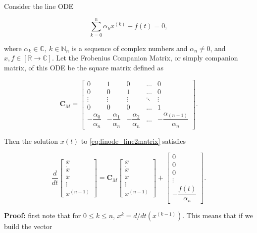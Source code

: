 \begin{theorem} \label{theorem:line_to_matrixode_equiv} %

	Consider the line ODE

\begin{equation} \sum\limits_{k=0}^n \alpha_k x^{\left(k\right)} + f(t) = 0, \label{eq:linode_line2matrix}\end{equation}

	\noindent where $\alpha_k\in\mathbb{C},\ k\in\mathbb{N}_n$ is a sequence of complex numbers and $\alpha_n\neq 0$, and $x,f \in\left[\mathbb{R}\to\mathbb{C}\right]$. Let the Frobenius Companion Matrix, or simply companion matrix, of this ODE be the square matrix defined as

\begin{equation} \mathbf{C}_M = \left[\begin{array}{ccccc} 0 & 1 & 0 & ... & 0 \\[3mm] 0 & 0 & 1 & ... & 0  \\[3mm] \vdots & \vdots & \vdots & \ddots & \vdots \\[3mm] 0 & 0 & 0 & ... & 1 \\[3mm] - \dfrac{\alpha_0}{\alpha_n} & - \dfrac{\alpha_1}{\alpha_n} & -\dfrac{\alpha_2}{\alpha_n} & ... & -\dfrac{\alpha_{(n-1)}}{\alpha_n} \end{array}\right] . \end{equation}

	Then the solution $x(t)$ to \eqref{eq:linode_line2matrix} satisfies

\begin{equation} \dfrac{d}{dt}\left[\begin{array}{c} x \\[3mm] \dot{x} \\[3mm] \ddot{x} \\[3mm] \vdots \\[3mm] x^{(n-1)}\end{array}\right] = \mathbf{C}_M \left[\begin{array}{c} x \\[3mm] \dot{x} \\[3mm] \ddot{x} \\[3mm] \vdots \\[3mm] x^{(n-1)}\end{array}\right] + \left[\begin{array}{c} 0 \\[3mm] 0 \\[3mm] 0 \\[3mm] \vdots \\[3mm] -\dfrac{f(t)}{\alpha_n} \end{array}\right] . \end{equation}

\end{theorem}
\noindent\textbf{Proof:} first note that for $0\leq k \leq n$, $x^k = d/dt\left(x^{(k-1)}\right)$. This means that if we build the vector

